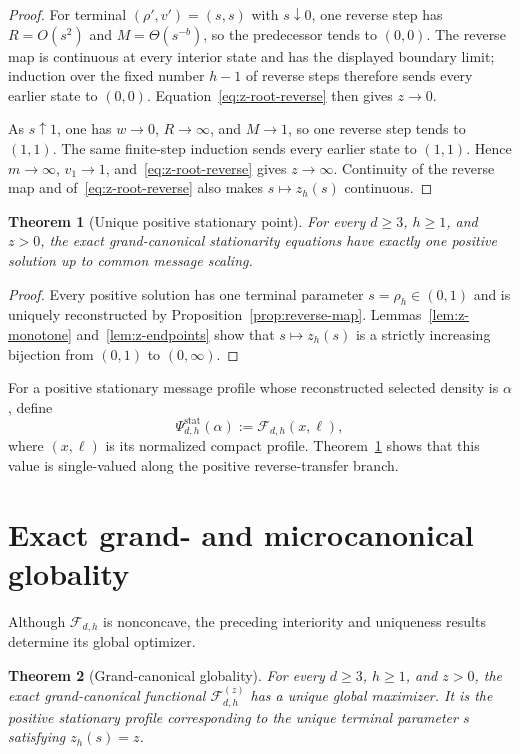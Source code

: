 \documentclass[11pt]{amsart}
\newtheorem{theorem}{Theorem}[section]
\theoremstyle{definition}
\newcommand{\Fcal}{\mathcal F}
\begin{document}
\begin{proof}
For terminal $(\rho',v')=(s,s)$ with $s\downarrow0$, one reverse step has $R=O(s^2)$ and $M=\Theta(s^{-b})$, so the predecessor tends to $(0,0)$.  The reverse map is continuous at every interior state and has the displayed boundary limit; induction over the fixed number $h-1$ of reverse steps therefore sends every earlier state to $(0,0)$.  Equation~\eqref{eq:z-root-reverse} then gives $z\to0$.

As $s\uparrow1$, one has $w\to0$, $R\to\infty$, and $M\to1$, so one reverse step tends to $(1,1)$.  The same finite-step induction sends every earlier state to $(1,1)$.  Hence $m\to\infty$, $v_1\to1$, and~\eqref{eq:z-root-reverse} gives $z\to\infty$.  Continuity of the reverse map and of~\eqref{eq:z-root-reverse} also makes $s\mapsto z_h(s)$ continuous.
\end{proof}

\begin{theorem}[Unique positive stationary point]\label{thm:unique-stationary}
For every $d\ge3$, $h\ge1$, and $z>0$, the exact grand-canonical stationarity equations have exactly one positive solution up to common message scaling.
\end{theorem}

\begin{proof}
Every positive solution has one terminal parameter $s=\rho_h\in(0,1)$ and is uniquely reconstructed by Proposition~\ref{prop:reverse-map}.  Lemmas~\ref{lem:z-monotone} and~\ref{lem:z-endpoints} show that $s\mapsto z_h(s)$ is a strictly increasing bijection from $(0,1)$ to $(0,\infty)$.
\end{proof}


For a positive stationary message profile whose reconstructed selected density is $\alpha$, define
\[
 \Psi^{\mathrm{stat}}_{d,h}(\alpha)
 :=\Fcal_{d,h}(x,\ell),
\]
where $(x,\ell)$ is its normalized compact profile.  Theorem~\ref{thm:unique-stationary} shows that this value is single-valued along the positive reverse-transfer branch.

\section{Exact grand- and microcanonical globality}
Although $\Fcal_{d,h}$ is nonconcave, the preceding interiority and uniqueness results determine its global optimizer.

\begin{theorem}[Grand-canonical globality]\label{thm:grand-globality}
For every $d\ge3$, $h\ge1$, and $z>0$, the exact grand-canonical functional $\Fcal_{d,h}^{(z)}$ has a unique global maximizer.  It is the positive stationary profile corresponding to the unique terminal parameter $s$ satisfying $z_h(s)=z$.
\end{theorem}
\end{document}

